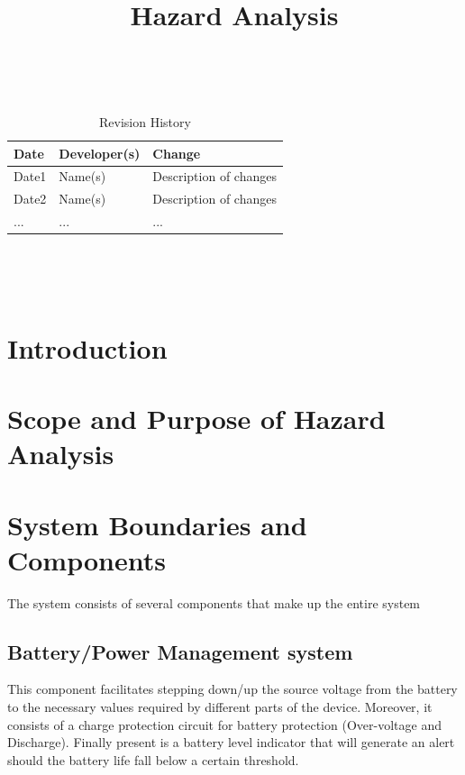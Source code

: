\documentclass{article}
\title{Hazard Analysis\\\progname}
\author{\authname}
\date{}
\begin{document}
\maketitle
\thispagestyle{empty}

~\newpage


\begin{table}[hp]
\caption{Revision History} \label{TblRevisionHistory}
\begin{tabularx}{\textwidth}{llX}
\toprule
\textbf{Date} & \textbf{Developer(s)} & \textbf{Change}\\
\midrule
Date1 & Name(s) & Description of changes\\
Date2 & Name(s) & Description of changes\\
... & ... & ...\\
\bottomrule
\end{tabularx}
\end{table}

~\newpage

\tableofcontents

~\newpage



\section{Introduction}


\section{Scope and Purpose of Hazard Analysis}

\section{System Boundaries and Components}
The system consists of several components that make up the entire system

	\subsection{Battery/Power Management system}
		This component facilitates stepping down/up the source voltage from the battery to the necessary values required by different parts of the device. Moreover, it consists of a 										charge protection circuit for battery protection (Over-voltage and Discharge). Finally present is a battery level indicator that will generate an alert should the battery life fall below a certain threshold.  
\end{document}
